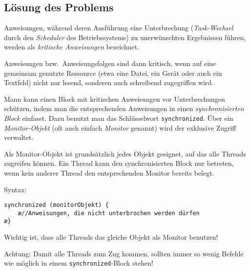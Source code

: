 \subsection{Lösung des Problems}

Anweisungen, während deren Ausführung eine Unterbrechung (\emph{Task-Wechsel}
durch den \emph{Scheduler} des Betriebssystems) zu unerwünschten Ergebnissen
führen, werden als \emph{kritische Anweisungen} bezeichnet.

Anweisungen bzw.\ Anweisungsfolgen sind dann kritisch, wenn auf eine gemeinsam
genutzte Ressource (etwa eine Datei, ein Gerät oder auch ein Textfeld) nicht nur
lesend, sonderen auch schreibend zugegriffen wird.

Mann kann einen Block mit kritischen Anweisungen vor Unterbrechungen schützen,
indem man die entsprechenden Anweisungen in einen \emph{synchronisierten Block}
einfasst. Dazu benutzt man das Schlüsselwort \lstinline|synchronized|. Über ein
\emph{Monitor-Objekt} (oft auch einfach \emph{Monitor} genannt) wird der
exklusive Zugriff verwaltet.

Als Monitor-Objekt ist grundsätzlich jedes Objekt geeignet, auf das alle
Threads zugreifen können. Ein Thread kann den synchronisierten Block nur
betreten, wenn kein anderer Thread den entsprechenden Monitor bereits belegt.

\pagebreak

Syntax:

\begin{lstlisting}
synchronized (monitorObjekt) {
    æ//Anweisungen, die nicht unterbrochen werden dürfen
æ}
\end{lstlisting}


Wichtig ist, dass alle Threads das gleiche Objekt als Monitor benutzen!

Achtung: Damit alle Threads zum Zug kommen, sollten immer so wenig Befehle wie
möglich in einem \lstinline|synchronized|-Block stehen!

